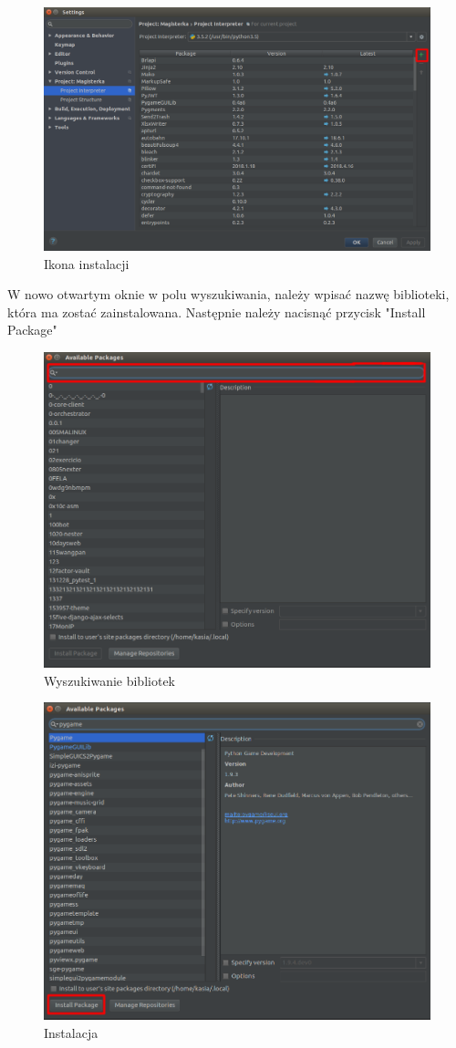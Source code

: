 \begin{figure}[h]
\centering
\includegraphics[width=13cm]{Zdjecia/5/kasia/settings4}
\caption{Ikona instalacji}
\label{fig:file}
\end{figure}

W nowo otwartym oknie w polu wyszukiwania, należy wpisać nazwę biblioteki, która ma zostać zainstalowana. Następnie należy nacisnąć przycisk "Install Package"

\begin{figure}[h]
\centering
\includegraphics[width=13cm]{Zdjecia/5/kasia/settings5}
\caption{Wyszukiwanie bibliotek}
\label{fig:file}
\end{figure}

\begin{figure}[h]
\centering
\includegraphics[width=13cm]{Zdjecia/5/kasia/settings6}
\caption{Instalacja}
\label{fig:file}
\end{figure}
